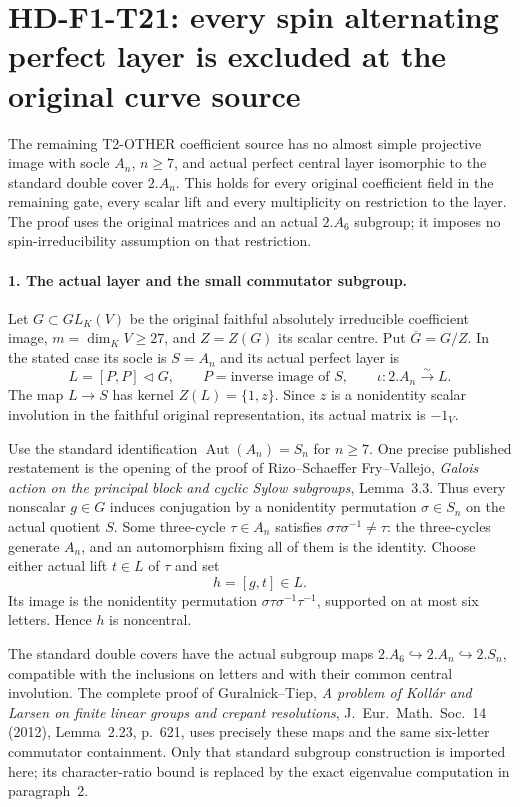 \section[HD-F1-T21: spin alternating source exclusion]{HD-F1-T21: every spin alternating perfect layer is excluded at the original curve source}
\label{sec:f1-spin-alternating-source}

The remaining T2-OTHER coefficient source has no almost
simple projective image with socle $A_n$, $n\ge7$, and
actual perfect central layer isomorphic to the standard
double cover $2.A_n$. This holds for every original
coefficient field in the remaining gate, every scalar
lift and every multiplicity on restriction to the layer.
The proof uses the original matrices and an actual
$2.A_6$ subgroup; it imposes no spin-irreducibility
assumption on that restriction.

\paragraph{1. The actual layer and the small commutator subgroup.}
Let $G\subset GL_K(V)$ be the original faithful absolutely
irreducible coefficient image, $m=\dim_KV\ge27$, and
$Z=Z(G)$ its scalar centre. Put $\overline G=G/Z$.
In the stated case its socle is $S=A_n$ and its actual
perfect layer is
\[
 L=[P,P]\triangleleft G,\qquad
 P=\text{inverse image of }S,\qquad
 \iota:2.A_n\xrightarrow{\sim}L.
 \tag{F1T21.1}
\]
The map $L\to S$ has kernel $Z(L)=\{1,z\}$.
Since $z$ is a nonidentity scalar involution in the
faithful original representation, its actual matrix
is $-1_V$.

Use the standard identification $\operatorname{Aut}(A_n)=S_n$
for $n\ge7$. One precise published restatement is the
opening of the proof of Rizo--Schaeffer Fry--Vallejo,
\emph{Galois action on the principal block and cyclic
Sylow subgroups}, Lemma~3.3. Thus every nonscalar
$g\in G$ induces conjugation by a nonidentity
permutation $\sigma\in S_n$ on the actual quotient
$S$. Some three-cycle $\tau\in A_n$ satisfies
$\sigma\tau\sigma^{-1}\ne\tau$: the three-cycles
generate $A_n$, and an automorphism fixing all of
them is the identity. Choose either actual lift
$t\in L$ of $\tau$ and set
\[
                   h=[g,t]\in L.
 \tag{F1T21.2}
\]
Its image is the nonidentity permutation
$\sigma\tau\sigma^{-1}\tau^{-1}$, supported on at
most six letters. Hence $h$ is noncentral.

The standard double covers have the actual subgroup
maps $2.A_6\hookrightarrow2.A_n\hookrightarrow2.S_n$,
compatible with the inclusions on letters and with
their common central involution. The complete proof
of Guralnick--Tiep, \emph{A problem of Koll\'ar and
Larsen on finite linear groups and crepant resolutions},
J.~Eur.~Math.~Soc.~14 (2012), Lemma~2.23, p.~621,
uses precisely these maps and the same six-letter
commutator containment. Only that standard subgroup
construction is imported here; its character-ratio
bound is replaced by the exact eigenvalue computation
in paragraph~2.

